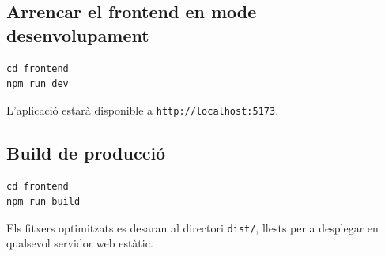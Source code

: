 \subsection{Arrencar el frontend en mode desenvolupament}

\begin{verbatim}
cd frontend
npm run dev
\end{verbatim}

L'aplicació estarà disponible a \texttt{http://localhost:5173}.

\subsection{Build de producció}

\begin{verbatim}
cd frontend
npm run build
\end{verbatim}

Els fitxers optimitzats es desaran al directori \texttt{dist/}, llests per a desplegar en qualsevol servidor web estàtic.

